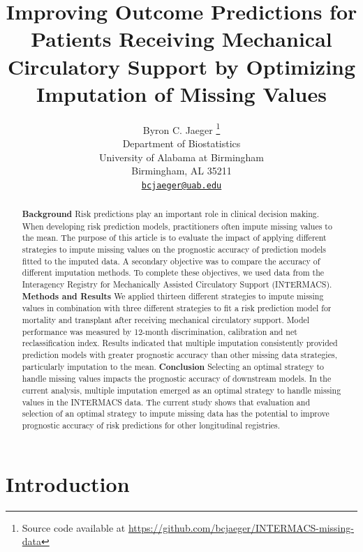 \documentclass{article}
\title{Improving Outcome Predictions for Patients Receiving Mechanical
Circulatory Support by Optimizing Imputation of Missing Values}
\author{
    Byron C. Jaeger
    \thanks{Source code available at
\url{https://github.com/bcjaeger/INTERMACS-missing-data}}
   \\
    Department of Biostatistics \\
    University of Alabama at Birmingham \\
  Birmingham, AL 35211 \\
  \texttt{\href{mailto:bcjaeger@uab.edu}{\nolinkurl{bcjaeger@uab.edu}}} \\
  }
\begin{document}
\maketitle

\def\tightlist{}


\begin{abstract}
\textbf{Background} Risk predictions play an important role in clinical
decision making. When developing risk prediction models, practitioners
often impute missing values to the mean. The purpose of this article is
to evaluate the impact of applying different strategies to impute
missing values on the prognostic accuracy of prediction models fitted to
the imputed data. A secondary objective was to compare the accuracy of
different imputation methods. To complete these objectives, we used data
from the Interagency Registry for Mechanically Assisted Circulatory
Support (INTERMACS). \newline\textbf{Methods and Results} We applied
thirteen different strategies to impute missing values in combination
with three different strategies to fit a risk prediction model for
mortality and transplant after receiving mechanical circulatory support.
Model performance was measured by 12-month discrimination, calibration
and net reclassification index. Results indicated that multiple
imputation consistently provided prediction models with greater
prognostic accuracy than other missing data strategies, particularly
imputation to the mean. \newline\textbf{Conclusion} Selecting an optimal
strategy to handle missing values impacts the prognostic accuracy of
downstream models. In the current analysis, multiple imputation emerged
as an optimal strategy to handle missing values in the INTERMACS data.
The current study shows that evaluation and selection of an optimal
strategy to impute missing data has the potential to improve prognostic
accuracy of risk predictions for other longitudinal registries.
\end{abstract}


\hypertarget{introduction}{%
\section{Introduction}\label{introduction}}

\label{sec:introduction}
\end{document}

